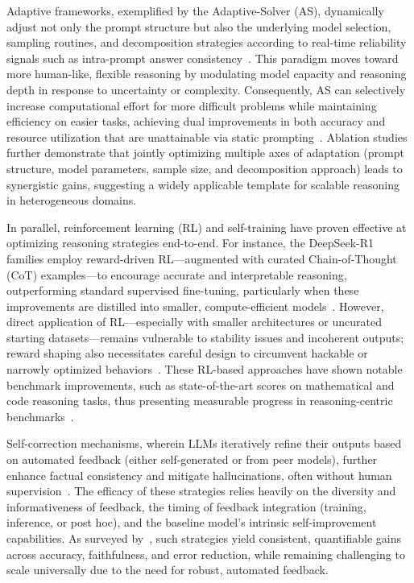\documentclass[sigconf]{acmart}
\begin{document}
Adaptive frameworks, exemplified by the Adaptive-Solver (AS), dynamically adjust not only the prompt structure but also the underlying model selection, sampling routines, and decomposition strategies according to real-time reliability signals such as intra-prompt answer consistency~\cite{ref4,ref57}. This paradigm moves toward more human-like, flexible reasoning by modulating model capacity and reasoning depth in response to uncertainty or complexity. Consequently, AS can selectively increase computational effort for more difficult problems while maintaining efficiency on easier tasks, achieving dual improvements in both accuracy and resource utilization that are unattainable via static prompting~\cite{ref4,ref57}. Ablation studies further demonstrate that jointly optimizing multiple axes of adaptation (prompt structure, model parameters, sample size, and decomposition approach) leads to synergistic gains, suggesting a widely applicable template for scalable reasoning in heterogeneous domains.

In parallel, reinforcement learning (RL) and self-training have proven effective at optimizing reasoning strategies end-to-end. For instance, the DeepSeek-R1 families employ reward-driven RL—augmented with curated Chain-of-Thought (CoT) examples—to encourage accurate and interpretable reasoning, outperforming standard supervised fine-tuning, particularly when these improvements are distilled into smaller, compute-efficient models~\cite{ref56,ref57,ref103}. However, direct application of RL—especially with smaller architectures or uncurated starting datasets—remains vulnerable to stability issues and incoherent outputs; reward shaping also necessitates careful design to circumvent hackable or narrowly optimized behaviors~\cite{ref56,ref57}. These RL-based approaches have shown notable benchmark improvements, such as state-of-the-art scores on mathematical and code reasoning tasks, thus presenting measurable progress in reasoning-centric benchmarks~\cite{ref57}.

Self-correction mechanisms, wherein LLMs iteratively refine their outputs based on automated feedback (either self-generated or from peer models), further enhance factual consistency and mitigate hallucinations, often without human supervision~\cite{ref68}. The efficacy of these strategies relies heavily on the diversity and informativeness of feedback, the timing of feedback integration (training, inference, or post hoc), and the baseline model's intrinsic self-improvement capabilities. As surveyed by~\cite{ref68}, such strategies yield consistent, quantifiable gains across accuracy, faithfulness, and error reduction, while remaining challenging to scale universally due to the need for robust, automated feedback.
\end{document}
